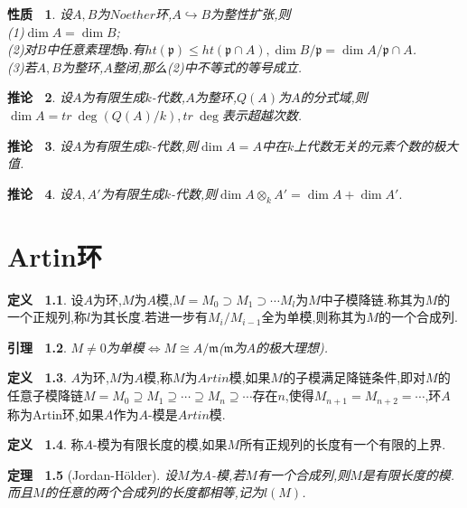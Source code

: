 \documentclass[b5paper,oneside]{ctexbook}
\newcommand{\mf}[1]{\mathfrak{#1}}
\theoremstyle{plain}
\newtheorem{thm}{定理~}[chapter]
\newtheorem{lem}[thm]{引理~}
\newtheorem{prop}[thm]{性质~}
\newtheorem{cor}[thm]{推论~}
\theoremstyle{definition}
\newtheorem{defn}[thm]{定义~}
\begin{document}
\begin{prop}设$A,B$为$Noether$环,$A\hookrightarrow B$为整性扩张,则\\
(1)$\dim A=\dim B$;\\
(2)对$B$中任意素理想$\mf{p}$.有$ht(\mf{p})\leq ht(\mf{p}\cap A),\dim B/\mf{p}=\dim A/\mf{p}\cap A$.\\
(3)若$A,B$为整环,$A$整闭,那么(2)中不等式的等号成立.
\end{prop}
\begin{cor}设$A$为有限生成$k$-代数,$A$为整环,$Q(A)$为$A$的分式域,则$\dim A=tr~\deg(Q(A)/k),tr~\deg$表示超越次数.
\end{cor}
\begin{cor} 
设$A$为有限生成$k$-代数,则$\dim A=A$中在$k$上代数无关的元素个数的极大值.
\end{cor}
\begin{cor} 
设$A,A'$为有限生成$k$-代数,则$\dim A\otimes_{k}A'=\dim A+\dim A'.$
\end{cor}
\chapter{Artin环}
\begin{defn}设$A$为环,$M$为$A$模,$M=M_0\supset M_1\supset \cdots M_l$为$M$中子模降链.称其为$M$的一个正规列,称$l$为其长度.若进一步有$M_i/M_{i-1}$全为单模,则称其为$M$的一个合成列.
\end{defn}
\begin{lem}$M \neq 0$为单模$\Leftrightarrow M\cong A/\mf{m}$($\mf{m}$为$A$的极大理想).
\end{lem}
\begin{defn}$A$为环,$M$为$A$模,称$M$为$Artin$模,如果$M$的子模满足降链条件,即对$M$的任意子模降链$M=M_0\supseteq M_1\supseteq \cdots\supseteq M_n\supseteq \cdots$存在$n$,使得$M_{n+1}=M_{n+2}=\cdots$,环$A$称为Artin环,如果$A$作为$A$-模是$Artin$模.
\end{defn}
\begin{defn}称$A$-模为有限长度的模,如果$M$所有正规列的长度有一个有限的上界.
\end{defn}
\begin{thm}[Jordan-H\"{o}lder]设$M$为$A$-模,若$M$有一个合成列,则$M$是有限长度的模.而且$M$的任意的两个合成列的长度都相等,记为$l(M)$.
\end{thm}
\end{document}
